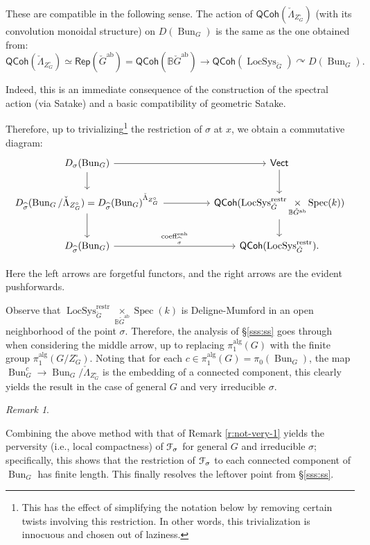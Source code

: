 \documentclass[reqno,11pt]{amsart}
\numberwithin{equation}{subsection}
\theoremstyle{remark}
\newtheorem{rem}[thm]{Remark}
\newcommand{\bB}{{\mathbb B}}
\newcommand{\sF}{{\EuScript F}}
\newcommand{\on}{\operatorname}
\newcommand{\Spec}{\on{Spec}}
\newcommand{\Rep}{\mathsf{Rep}}
\newcommand{\actson}{\curvearrowright}
\newcommand{\Vect}{\mathsf{Vect}}
\newcommand{\Bun}{\on{Bun}}
\newcommand{\LocSys}{\on{LocSys}}
\newcommand{\QCoh}{\mathsf{QCoh}}
\newcommand{\coeff}{\on{coeff}}
\newcommand{\enh}{\on{enh}}
\begin{document}
These are compatible in the following sense. The action of
$\QCoh(\check{\Lambda}_{Z_G^\circ})$ (with its convolution monoidal structure) 
on $D(\Bun_G)$ is the same as the one obtained from:
%
\[
\QCoh(\check{\Lambda}_{Z_G^\circ}) \simeq 
\Rep(\check{G}^{\on{ab}}) = \QCoh(\bB \check{G}^{\on{ab}})
\to \QCoh(\LocSys_{\check{G}}) \actson D(\Bun_G).
\]

\noindent Indeed, this is an immediate consequence of the construction 
of the spectral action (via Satake) and a basic compatibility of geometric Satake.

Therefore, up to trivializing\footnote{This has the effect of simplifying the
notation below by removing certain twists involving this restriction. In other
words, this trivialization is innocuous and chosen out of laziness.}
the restriction of $\sigma$ at $x$, we obtain a commutative diagram:
%
\[
\begin{tikzcd}
D_{\sigma}(\Bun_G)
\arrow[rr]
\arrow[d]
&&
\Vect
\arrow[d]
\\
D_{\widehat{\sigma}}(\Bun_G/\check{\Lambda}_{Z_G^\circ}) = 
D_{\widehat{\sigma}}(\Bun_G)^{\check{\Lambda}_{Z_G^\circ}}
\arrow[rr]
\arrow[d]
&&
\QCoh(\LocSys_{\check{G}}^{\on{restr}} \underset{\bB \check{G}^{\on{ab}}}{\times} \Spec(k))
\arrow[d]
\\
D_{\widehat{\sigma}}(\Bun_G) 
\arrow[rr,"\coeff_{\widehat{\sigma}}^{\enh}"]
&&
\QCoh(\LocSys_{\check{G}}^{\on{restr}}).
\end{tikzcd}
\]

\noindent Here the left arrows are forgetful functors, and 
the right arrows are the evident pushforwards.

Observe that 
$\LocSys_{\check{G}}^{\on{restr}} \underset{\bB \check{G}^{\on{ab}}}{\times} \Spec(k)$
is Deligne-Mumford in an open neighborhood of the point $\sigma$. 
Therefore, the analysis of \S \ref{sss:ss} goes through when considering the
middle arrow, up to replacing $\pi_1^{\on{alg}}(G)$ with the finite
group $\pi_1^{\on{alg}}(G/Z_G^{\circ})$. 
Noting that for each $c \in \pi_1^{\on{alg}}(G) = \pi_0(\Bun_G)$, the 
map $\Bun_G^c \to \Bun_G/\check{\Lambda}_{Z_G^\circ}$ is the embedding
of a connected component, this clearly yields the result in the case
of general $G$ and very irreducible $\sigma$.

\begin{rem}\label{r:not-very-2}

Combining the above method with that of Remark \ref{r:not-very-1} yields
the perversity (i.e., local compactness) of $\sF_{\sigma}$ for 
general $G$ and irreducible $\sigma$; specifically, this shows that the restriction of
$\sF_{\sigma}$ to each connected component of $\Bun_G$ has finite length.
This finally resolves the leftover point from \S \ref{sss:ss}.

\end{rem}
\end{document}
